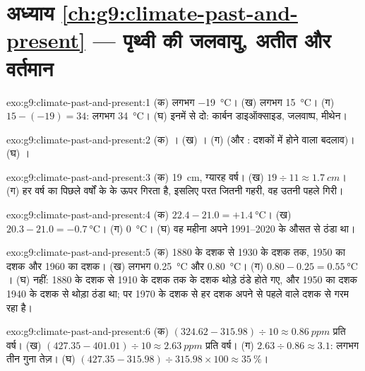 \section*{अध्याय \ref{ch:g9:climate-past-and-present} --- पृथ्वी की जलवायु, अतीत और वर्तमान}

\begin{solution}{exo:g9:climate-past-and-present:1}
(क) लगभग \qty{-19}{\degreeCelsius}। (ख) लगभग \qty{15}{\degreeCelsius}।
(ग) $15 - (-19) = 34$: लगभग \qty{34}{\degreeCelsius}। (घ) इनमें से दो:
कार्बन डाइऑक्साइड, जलवाष्प, मीथेन।
\end{solution}

\begin{solution}{exo:g9:climate-past-and-present:2}
(क) । (ख) । (ग)  (और : दशकों में होने वाला बदलाव)।
(घ) ।
\end{solution}

\begin{solution}{exo:g9:climate-past-and-present:3}
(क) \qty{19}{cm}, ग्यारह वर्ष। (ख) $19 \div 11 \approx \qty{1.7}{cm}$।
(ग) हर वर्ष का  पिछले वर्षों के  के ऊपर गिरता है, इसलिए परत जितनी गहरी, वह
उतनी पहले गिरी।
\end{solution}

\begin{solution}{exo:g9:climate-past-and-present:4}
(क) $22.4 - 21.0 = +\qty{1.4}{\degreeCelsius}$। (ख) $20.3 - 21.0 =
\qty{-0.7}{\degreeCelsius}$। (ग) \qty{0}{\degreeCelsius}। (घ) वह महीना
अपने 1991--2020 के औसत से ठंडा था।
\end{solution}

\begin{solution}{exo:g9:climate-past-and-present:5}
(क) 1880 के दशक से 1930 के दशक तक, 1950 का दशक और 1960 का दशक। (ख) लगभग
\qty{0.25}{\degreeCelsius} और \qty{0.80}{\degreeCelsius}। (ग) $0.80 -
0.25 = \qty{0.55}{\degreeCelsius}$। (घ) नहीं: 1880 के दशक से 1910 के दशक तक के दशक थोड़े
ठंडे होते गए, और 1950 का दशक 1940 के दशक से थोड़ा ठंडा था; पर 1970 के दशक से हर दशक
अपने से पहले वाले दशक से गरम रहा
है।
\end{solution}

\begin{solution}{exo:g9:climate-past-and-present:6}
(क) $(324.62 - 315.98) \div 10 \approx \qty{0.86}{ppm}$ प्रति वर्ष। (ख)
$(427.35 - 401.01) \div 10 \approx \qty{2.63}{ppm}$ प्रति वर्ष। (ग) $2.63
\div 0.86 \approx 3.1$: लगभग तीन गुना तेज़। (घ) $(427.35 - 315.98)
\div 315.98 \times 100 \approx 35~\%$।
\end{solution}

